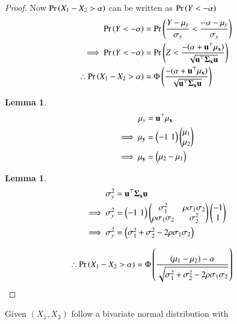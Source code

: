\documentclass[journal,12pt,twocolumn]{IEEEtran}
\newtheorem{lemma}[theorem]{Lemma}
\begin{document}
\begin{proof}
    Now $\Pr\left(X_1-X_2>\alpha\right)$ can be written as $\Pr\left(Y<-\alpha\right)$
    \begin{align}
        \Pr\left(Y<-\alpha\right)&=\Pr\left(\frac{Y-\mu_y}{\sigma_y}<\frac{-\alpha-\mu_y}{\sigma_y}\right)\\
        \implies \Pr\left(Y<-\alpha\right)&=\Pr\left(Z<\frac{-(\alpha+\mathbf{u}^{\top}\mathbf{\mu_{\mathbf{x}})}}{\sqrt{\mathbf{u}^{\top}\mathbf{\Sigma_{\mathbf{x}}}\mathbf{u}}}\right)\\
        \therefore \Pr\left(X_1-X_2>\alpha\right)&=\Phi\left(\frac{-(\alpha+\mathbf{u}^{\top}\mathbf{\mu_{\mathbf{x}})}}{\sqrt{\mathbf{u}^{\top}\mathbf{\Sigma_{\mathbf{x}}}\mathbf{u}}}\right)
        \label{a}
    \end{align}
    \begin{lemma}
        \begin{align}
            \mu_{y}&=\mathbf{u}^{\top}\mathbf{\mu_{\mathbf{x}}}\\
            \implies \mu_{\mathbf{y}}&=\begin{pmatrix}-1\,\,1\end{pmatrix}\begin{pmatrix}\mu_1\\
                                                      \mu_2\end{pmatrix}\\
            \implies \mu_{\mathbf{y}}&=\begin{pmatrix}\mu_2-\mu_1\end{pmatrix}
        \end{align}
    \end{lemma}
    \begin{lemma}
        \begin{align}
        \sigma^2_{y}&=\mathbf{u}^{\top}\mathbf{\Sigma_{\mathbf{x}}}\mathbf{u}\\
        \implies \sigma^2_{y}&=\begin{pmatrix}-1\,\,1\end{pmatrix}\begin{pmatrix}\sigma^2_1&\rho\sigma_1\sigma_2\\
                                                         \rho\sigma_1\sigma_2&\sigma^2_2\end{pmatrix}\begin{pmatrix}-1\\
                                                                                                1\end{pmatrix}\\
        \implies \sigma^2_{y}&=\begin{pmatrix}\sigma^2_1+\sigma^2_2-2\rho\sigma_1\sigma_2\end{pmatrix}
        \end{align}
    \end{lemma}
    \begin{align}
        \therefore \Pr\left(X_1-X_2>\alpha\right)&=\Phi\left(\frac{(\mu_1-\mu_2)-\alpha}{\sqrt{\sigma^2_1+\sigma^2_2-2\rho\sigma_1\sigma_2}}\right)
    \end{align}
\end{proof}
Given $(X_1,X_2)$ follow a bivariate normal distribution with
\end{document}
